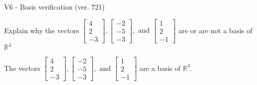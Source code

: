 \begin{exercise}
  \begin{exerciseTitle}V6 - Basis verification (ver. 721)\end{exerciseTitle}
  \begin{exerciseStatement}
    Explain why the vectors \(\left[\begin{array}{r}
4 \\
2 \\
-3
\end{array}\right] , \left[\begin{array}{r}
-2 \\
-5 \\
-3
\end{array}\right] , \text{ and } \left[\begin{array}{r}
1 \\
2 \\
-1
\end{array}\right]\) are or are not a basis of \(\mathbb{R}^3\)	


  \end{exerciseStatement}
  \begin{exerciseAnswer}
   The vectors \(\left[\begin{array}{r}
4 \\
2 \\
-3
\end{array}\right] , \left[\begin{array}{r}
-2 \\
-5 \\
-3
\end{array}\right] , \text{ and } \left[\begin{array}{r}
1 \\
2 \\
-1
\end{array}\right]\) 
  	 are  a basis of \(\mathbb{R}^3\).
  


  \end{exerciseAnswer}
\end{exercise}